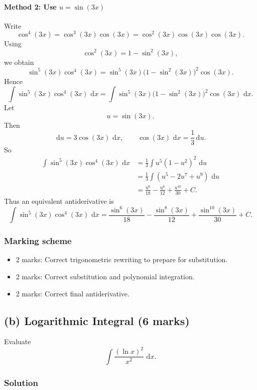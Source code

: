 \documentclass[12pt]{article}
\newcommand{\dd}{\,\mathrm{d}}
\begin{document}
\paragraph{Method 2: Use \(u=\sin(3x)\)}
Write
\[
\cos^4(3x)=\cos^3(3x)\cos(3x)=\cos^2(3x)\cos(3x)\cos(3x).
\]
Using
\[
\cos^2(3x)=1-\sin^2(3x),
\]
we obtain
\[
\sin^5(3x)\cos^4(3x)
=\sin^5(3x)\bigl(1-\sin^2(3x)\bigr)^2\cos(3x).
\]
Hence
\[
\int \sin^5(3x)\cos^4(3x)\,\dd x
=
\int \sin^5(3x)\bigl(1-\sin^2(3x)\bigr)^2\cos(3x)\,\dd x.
\]
Let
\[
u=\sin(3x).
\]
Then
\[
\dd u=3\cos(3x)\,\dd x,
\qquad
\cos(3x)\,\dd x=\frac{1}{3}\dd u.
\]
So
\begin{align*}
\int \sin^5(3x)\cos^4(3x)\,\dd x
&=\frac{1}{3}\int u^5(1-u^2)^2\,\dd u \\
&=\frac{1}{3}\int (u^5-2u^7+u^9)\,\dd u \\
&=\frac{u^6}{18}-\frac{u^8}{12}+\frac{u^{10}}{30}+C.
\end{align*}
Thus an equivalent antiderivative is
\[
\boxed{\int \sin^5(3x)\cos^4(3x)\,\dd x
=\frac{\sin^6(3x)}{18}-\frac{\sin^8(3x)}{12}+\frac{\sin^{10}(3x)}{30}+C.}
\]

\subsubsection{Marking scheme}
\begin{itemize}
\item 2 marks: Correct trigonometric rewriting to prepare for substitution.
\item 2 marks: Correct substitution and polynomial integration.
\item 2 marks: Correct final antiderivative.
\end{itemize}

\newpage
\subsection{(b) Logarithmic Integral \hfill (6 marks)}

Evaluate
\[
\int \frac{(\ln x)^2}{x^2}\,\dd x.
\]

\subsubsection{Solution}
\end{document}
